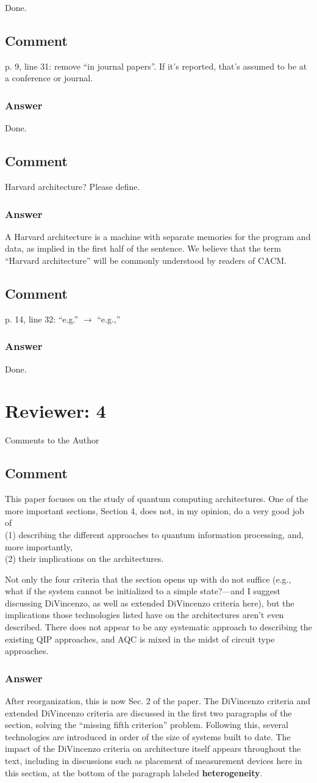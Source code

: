 \documentclass{article}
\newcommand{\comment}{\subsection{Comment}\em}
\newcommand{\answer}{\rm \subsubsection*{Answer}}
\begin{document}
Done.

\comment

p. 9, line 31: remove ``in journal papers''.  If it's reported, that's assumed to be at a conference or journal.

\answer

Done.

\comment

Harvard architecture?  Please define.

\answer

A Harvard architecture is a machine with separate memories for the
program and data, as implied in the first half of the sentence.  We
believe that the term ``Harvard architecture'' will be commonly
understood by readers of CACM.

\comment

p. 14, line 32: ``e.g.'' $\rightarrow$ ``e.g.,''

\answer

Done.

\section{Reviewer: 4}

Comments to the Author

\comment

This paper focuses on the study of quantum computing
architectures. One of the more important sections, Section 4, does
not, in my opinion, do a very good job of\\
(1) describing the different approaches to quantum information
processing, and, more importantly,\\
(2) their implications on the architectures.

Not only the four criteria that the section opens up with do not
suffice (e.g., what if the system cannot be initialized to a simple
state?---and I suggest discussing DiVincenzo, as well as extended
DiVincenzo criteria here), but the implications those technologies
listed have on the architectures aren't even described.  There does
not appear to be any systematic approach to describing the existing
QIP approaches, and AQC is mixed in the midst of circuit type
approaches.

\answer

After reorganization, this is now Sec. 2 of the paper.  The DiVincenzo
criteria and extended DiVincenzo criteria are discussed in the first
two paragraphs of the section, solving the ``missing fifth criterion''
problem.  Following this, several technologies are introduced in order
of the size of systems built to date.  The impact of the DiVincenzo
criteria on architecture itself appears throughout the text, including
in discussions such as placement of measurement devices here in this
section, at the bottom of the paragraph labeled {\bf heterogeneity}.
\end{document}
